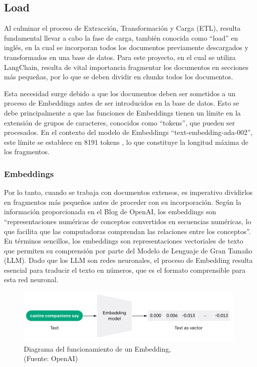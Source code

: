 \newpage

\subsection{Load}

\par Al culminar el proceso de Extracción, Transformación y Carga (ETL), resulta fundamental llevar a cabo la fase de carga, 
también conocida como ``load'' en inglés, en la cual se incorporan todos los documentos previamente descargados y transformados 
en una base de datos. Para este proyecto, en el cual se utiliza LangChain, resulta de vital importancia fragmentar los documentos 
en secciones más pequeñas, por lo que se deben dividir en chunks todos los documentos.

\par Esta necesidad surge debido a que los documentos deben ser sometidos a un proceso de Embeddings antes de ser 
introducidos en la base de datos. Esto se debe principalmente a que las funciones de Embeddings tienen un límite en la extensión 
de grupos de caracteres, conocidos como ``tokens'', que pueden ser procesados. En el contexto del modelo de Embeddings 
``text-embedding-ada-002'', este límite se establece en 8191 tokens \cite{openai1}, lo que constituye la longitud máxima de los fragmentos.

\subsubsection{Embeddings}



\par Por lo tanto, cuando se trabaja con documentos extensos, es imperativo dividirlos en fragmentos más pequeños antes de proceder 
con su incorporación. Según la información proporcionada en el Blog de OpenAI, los embeddings son ``representaciones numéricas 
de conceptos convertidos en secuencias numéricas, lo que facilita que las computadoras comprendan las relaciones entre los 
conceptos''\cite{openai1}. En términos sencillos, los embeddings son representaciones vectoriales de texto que permiten su comprensión por 
parte del Modelo de Lenguaje de Gran Tamaño (LLM). Dado que los LLM son redes neuronales, el proceso de Embedding resulta 
esencial para traducir el texto en números, que es el formato comprensible para esta red neuronal.

\begin{figure}[ht!]
    \centering
    \includegraphics[width=.7\textwidth]{figures/huemul4.png}
    \caption[Diagrama del funcionamiento de un Embedding]{Diagrama del funcionamiento de un Embedding,\\
    {\scriptsize (Fuente: OpenAI\cite{openai1})}}
    \label{fig:chatbot1}
\end{figure}

